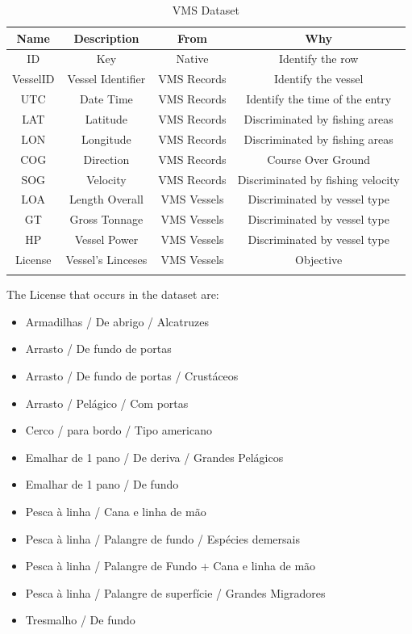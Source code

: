 \begin {table}[H]
\begin{center}
\begin{tabular}{c|c|c|c}
\textbf{Name }    & \textbf{Description} & \textbf{From} & \textbf{Why} \\
\hline
ID                & Key              & Native               & Identify the row           \\
VesselID          & Vessel Identifier   & VMS Records                & Identify the vessel  \\
UTC         & Date Time & VMS Records &Identify the time of the entry\\
LAT        & Latitude & VMS Records & Discriminated by fishing areas\\
LON        & Longitude & VMS Records & Discriminated by fishing areas\\
COG        & Direction & VMS Records & Course Over Ground\\
SOG        & Velocity & VMS Records & Discriminated by fishing velocity\\
LOA        & Length Overall & VMS Vessels & Discriminated by vessel type\\
GT        &  Gross Tonnage & VMS Vessels & Discriminated by vessel type\\
HP         &Vessel Power & VMS Vessels & Discriminated by vessel type\\
License        & Vessel's Linceses & VMS Vessels & Objective\\
           
\label{table:vms_dataset}
\end{tabular}
\caption {VMS Dataset}
\end{center}
\end {table}

The License that occurs in the dataset are:
\begin{itemize}
\item	Armadilhas / De abrigo / Alcatruzes
\item	Arrasto / De fundo de portas
\item	Arrasto / De fundo de portas / Crustáceos
\item	Arrasto / Pelágico / Com portas
\item	Cerco / para bordo / Tipo americano
\item	Emalhar de 1 pano / De deriva / Grandes Pelágicos
\item	Emalhar de 1 pano / De fundo
\item	Pesca à linha / Cana e linha de mão
\item	Pesca à linha / Palangre de fundo / Espécies demersais
\item	Pesca à linha / Palangre de Fundo + Cana e linha de mão
\item	Pesca à linha / Palangre de superfície / Grandes Migradores
\item	Tresmalho / De fundo
\end{itemize}


